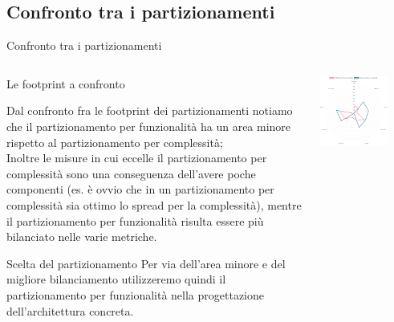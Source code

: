 \documentclass{beamer}
\begin{document}
	\subsection{Confronto tra i partizionamenti}
	\begin{frame}{Confronto tra i partizionamenti}
		  \begin{columns}
			\begin{column}{0.5\textwidth}
				\begin{block}{Le footprint a confronto}
					\begin{tiny}
						Dal confronto fra le footprint dei partizionamenti notiamo che il partizionamento per funzionalità ha un area minore rispetto al partizionamento per complessità; \\
						Inoltre le misure in cui eccelle il partizionamento per complessità sono una conseguenza dell'avere poche componenti (es. è ovvio che in un partizionamento per complessità sia ottimo lo spread per la complessità), mentre il partizionamento per funzionalità risulta essere più bilanciato nelle varie metriche.
					\end{tiny}
				\end{block}
			\begin{block}{Scelta del partizionamento}
				Per via dell'area minore e del migliore bilanciamento utilizzeremo quindi il partizionamento per funzionalità nella progettazione dell'architettura concreta.
			\end{block}
			\end{column}
			\begin{column}{0.5\textwidth}
				\begin{center}
					\includegraphics[width=0.75\textwidth, height=0.75\textheight, keepaspectratio=true]{part_confronto.png}
				\end{center}
			\end{column}
		\end{columns}
	\end{frame}
	
\end{document}
